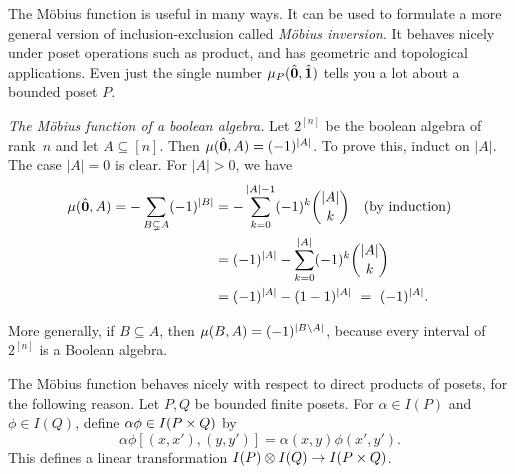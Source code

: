 \begin{example}
\begin{center}
\end{center}
\end{example}


The M\"obius function is useful in many ways.  It can be used to formulate a more general version of inclusion-exclusion called \emph{M\"obius inversion}.  It behaves nicely under poset operations such as product, and has geometric and topological applications.  Even just the single number $\mu_P(\hat{\mathbf{0}},\hat{\mathbf{1}})$ tells you a lot about a bounded poset $P$.  

\begin{example} \textit{The M\"obius function of a boolean algebra.}
Let $2^{[n]}$ be the boolean algebra of rank~$n$ and let $A\subseteq[n]$.
Then $\mu(\hat{\mathbf{0}},A)=(-1)^{|A|}$.  To prove this, induct on $|A|$.  The case $|A|=0$ is clear.  For $|A|>0$, we have
  \begin{align*}
  \mu(\hat{\mathbf{0}},A) = -\sum_{B\subsetneq A}(-1)^{|B|} &= -\sum_{k=0}^{|A|-1} (-1)^k\binom{|A|}{k} \quad\text{(by induction)}\\
    &= (-1)^{|A|} - \sum_{k=0}^{|A|} (-1)^k\binom{|A|}{k}\\
    &= (-1)^{|A|} - (1-1)^{|A|} ~=~ (-1)^{|A|}.
  \end{align*}

More generally, if $B\subseteq A$, then $\mu(B,A)=(-1)^{|B\setminus A|}$,
because every interval of $2^{[n]}$ is a Boolean algebra.
\end{example}

The M\"obius function behaves nicely with respect to direct products of posets, for the following reason.
Let $P,Q$ be bounded finite posets.  For $\alpha\in I(P)$ and $\phi\in I(Q)$, define $\alpha\phi\in I(P\times Q)$ by
\[\alpha\phi[(x,x'),(y,y')] = \alpha(x,y)\phi(x',y').\]
This defines a linear transformation $I(P)\otimes I(Q)\to I(P\times Q)$.

